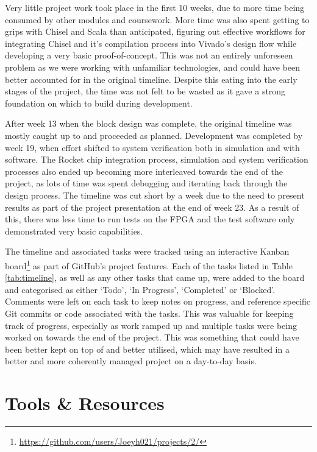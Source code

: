 Very little project work took place in the first 10 weeks, due to more time being consumed by other modules and coursework. More time was also spent getting to grips with Chisel and Scala than anticipated, figuring out effective workflows for integrating Chisel and it's compilation process into Vivado's design flow while developing a very basic proof-of-concept. This was not an entirely unforeseen problem as we were working with unfamiliar technologies, and could have been better accounted for in the original timeline. Despite this eating into the early stages of the project, the time was not felt to be wasted as it gave a strong foundation on which to build during development.

After week 13 when the block design was complete, the original timeline was mostly caught up to and proceeded as planned. Development was completed by week 19, when effort shifted to system verification both in simulation and with software. The Rocket chip integration process, simulation and system verification processes also ended up becoming more interleaved towards the end of the project, as lots of time was spent debugging and iterating back through the design process. The timeline was cut short by a week due to the need to present results as part of the project presentation at the end of week 23. As a result of this, there was less time to run tests on the FPGA and the test software only demonstrated very basic capabilities.

The timeline and associated tasks were tracked using an interactive Kanban board\footnote{\url{https://github.com/users/Joeyh021/projects/2/}} as part of GitHub's project features. Each of the tasks listed in Table \ref{tab:timeline}, as well as any other tasks that came up, were added to the board and categorised as either `Todo', `In Progress', `Completed' or `Blocked'. Comments were left on each task to keep notes on progress, and reference specific Git commits or code associated with the tasks. This was valuable for keeping track of progress, especially as work ramped up and multiple tasks were being worked on towards the end of the project. This was something that could have been better kept on top of and better utilised, which may have resulted in a better and more coherently managed project on a day-to-day basis.

\section{Tools \& Resources}

